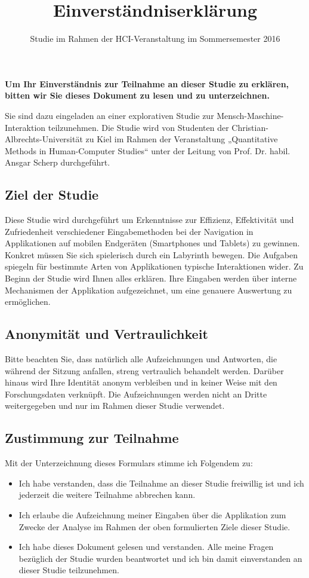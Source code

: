 \documentclass[10pt,a4paper]{scrartcl}
\title{Einverständniserklärung}
\subtitle{Studie im Rahmen der HCI-Veranstaltung im Sommersemester 2016}
\date{\vspace{-5ex}}
\begin{document}
\maketitle
\pagestyle{empty}

\vspace{0.5 cm}

\noindent
\textbf{Um Ihr Einverständnis zur Teilnahme an dieser Studie zu erklären, bitten wir Sie dieses Dokument zu lesen und zu unterzeichnen.}

\vspace{2 ex}
\noindent
Sie sind dazu eingeladen an einer explorativen Studie zur Mensch-Maschine-Interaktion teilzunehmen. Die Studie wird von Studenten der Christian-Albrechts-Universität zu Kiel im Rahmen der Veranstaltung „Quantitative Methods in Human-Computer Studies“ unter der Leitung von Prof. Dr. habil. Ansgar Scherp durchgeführt.

\subsection*{Ziel der Studie}
Diese Studie wird durchgeführt um Erkenntnisse zur Effizienz, Effektivität und Zufriedenheit verschiedener Eingabemethoden bei der Navigation in Applikationen auf mobilen Endgeräten (Smartphones und Tablets) zu gewinnen. Konkret müssen Sie sich spielerisch durch ein Labyrinth bewegen. Die Aufgaben spiegeln für bestimmte Arten von Applikationen typische Interaktionen wider. Zu Beginn der Studie wird Ihnen alles erklären.
Ihre Eingaben werden über interne Mechanismen der Applikation aufgezeichnet, um eine genauere Auswertung zu ermöglichen.

\subsection*{Anonymität und Vertraulichkeit}
Bitte beachten Sie, dass natürlich alle Aufzeichnungen und Antworten, die während der Sitzung anfallen, streng vertraulich behandelt werden. Darüber hinaus wird Ihre Identität anonym verbleiben und in keiner Weise mit den Forschungsdaten verknüpft. Die Aufzeichnungen werden nicht an Dritte weitergegeben und nur im Rahmen dieser Studie verwendet.

\subsection*{Zustimmung zur Teilnahme}
Mit der Unterzeichnung dieses Formulars stimme ich Folgendem zu:
\begin{itemize}
	\item Ich habe verstanden, dass die Teilnahme an dieser Studie freiwillig ist und ich jederzeit die weitere Teilnahme abbrechen kann.
	\item Ich erlaube die Aufzeichnung meiner Eingaben über die Applikation zum Zwecke der Analyse im Rahmen der oben formulierten Ziele dieser Studie.
	\item Ich habe dieses Dokument gelesen und verstanden. Alle meine Fragen bezüglich der Studie wurden beantwortet und ich bin damit einverstanden an dieser Studie teilzunehmen.
\end{itemize}
\end{document}
